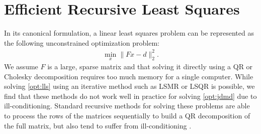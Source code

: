 \documentclass{article}
\begin{document}


\section{Efficient Recursive Least Squares} \label{sec:rls}
In its canonical formulation, a linear least squares problem can be represented as the
following unconstrained optimization problem:
\begin{align} \label{opt:lls}
  \min_x \|Fx - d\|_2^2.
\end{align}
We assume $F$ is a large, sparse matrix and that solving it directly using a QR or Cholesky
decomposition requires too much memory for a single computer. While solving \eqref{opt:lls}
using an iterative method such as LSMR \cite{Fong2011} or LSQR \cite{Paige1982} is possible,
we find that these methods do not work well in practice for solving \eqref{opt:jdmd} due to
ill-conditioning.  Standard recursive methods for solving these problems are able to process
the rows of the matrices sequentially to build a QR decomposition of the full matrix, but
also tend to suffer from ill-conditioning \cite{Strobach1990,Sayed2009,Ghirnikar1990}.
\end{document}
